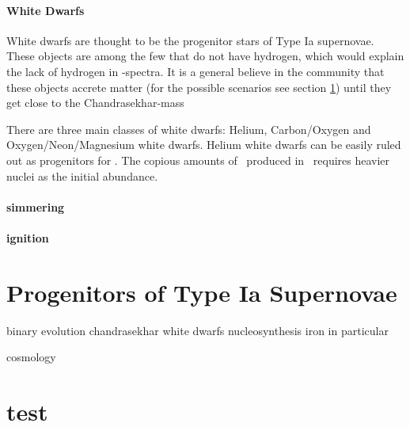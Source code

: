 \paragraph{White Dwarfs}
White dwarfs are thought to be the progenitor stars of Type Ia supernovae. These objects are among the few that do not have hydrogen, which would explain the lack of hydrogen in \snia-spectra. It is a general believe in the community that these objects accrete matter (for the possible scenarios see section \ref{sec:snia_progenitor}) until they get close to the Chandrasekhar-mass
 
There are three main classes of white dwarfs: Helium, Carbon/Oxygen and Oxygen/Neon/Magnesium white dwarfs. Helium white dwarfs can be easily ruled out as progenitors for \sneia. The copious amounts of \ige\ produced in \sneia\ requires heavier nuclei as the initial abundance. 

\paragraph{simmering}

\paragraph{ignition}



\section{Progenitors of Type Ia Supernovae}
\label{sec:snia_progenitor}


binary evolution
chandrasekhar
white dwarfs
nucleosynthesis
iron in particular

cosmology


\section{test}




